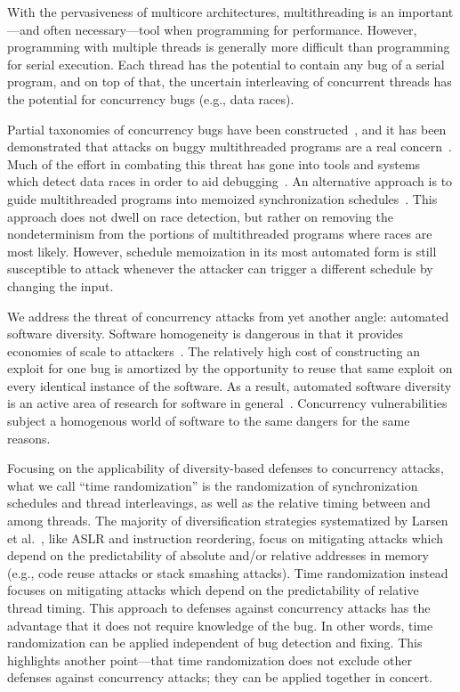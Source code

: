 With the pervasiveness of multicore architectures, multithreading is an
important---and often necessary---tool when programming for performance.
However, programming with multiple threads is generally more difficult than programming for serial execution.
Each thread has the potential to contain any bug of a serial program, and on
top of that, the uncertain interleaving of concurrent threads has the
potential for concurrency bugs (e.g., data races).

Partial taxonomies of concurrency bugs have been constructed~\cite{Farchi2003,Lu2008}, and it has been demonstrated that attacks on buggy multithreaded programs are a real concern~\cite{Yang2012}.
Much of the effort in combating this threat has gone into tools and systems which detect data races in order to aid debugging~\cite{Savage1997,Flanagan2004,Laadan2011,Pratikakis2011,Kasikci2013}.
An alternative approach is to guide multithreaded programs into memoized synchronization schedules~\cite{Cui2010}.
This approach does not dwell on race detection, but rather on removing the nondeterminism from the portions of multithreaded programs where races are most likely.
However, schedule memoization in its most automated form is still susceptible to attack whenever the attacker can trigger a different schedule by changing the input.

We address the threat of concurrency attacks from yet another angle: automated software diversity.
Software homogeneity is dangerous in that it provides economies of scale to attackers~\cite{Geer2003b}.
The relatively high cost of constructing an exploit for one bug is amortized by the opportunity to reuse that same exploit on every identical instance of the software.
As a result, automated software diversity is an active area of research for software in general~\cite{Larsen2014}.
Concurrency vulnerabilities subject a homogenous world of software to the same dangers for the same reasons.

Focusing on the applicability of diversity-based defenses to concurrency attacks, what we call ``time randomization'' is the randomization of synchronization schedules and thread interleavings, as well as the relative timing between and among threads.
The majority of diversification strategies systematized by Larsen et al.~\cite{Larsen2014}, like ASLR and instruction reordering, focus on mitigating attacks which depend on the predictability of absolute and/or relative addresses in memory (e.g., code reuse attacks or stack smashing attacks).
Time randomization instead focuses on mitigating attacks which depend on the predictability of relative thread timing.
This approach to defenses against concurrency attacks has the advantage that it does not require knowledge of the bug.
In other words, time randomization can be applied independent of bug detection and fixing.
This highlights another point---that time randomization does not exclude other defenses against concurrency attacks; they can be applied together in concert.

